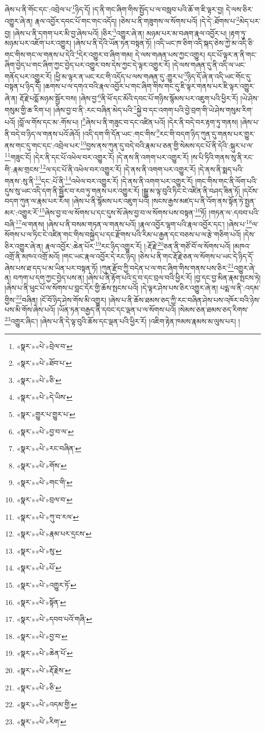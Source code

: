 ཞེས་པ་ནི་གོང་དང་:འབྲེལ་པ་\footnote{«སྣར་»«པེ་»བྲེལ་བ་}ཉིད་དོ། །ད་ནི་གང་ཞིག་གིས་སྤྱོད་པ་ལ་བསླབ་པའི་ཆོ་ག་ཇི་ལྟར་བྱ། དེ་ལས་ཅིར་འགྱུར་ཞེ་ན། རྣལ་འབྱོར་དབང་པོ་གང་གང་འདོད། །ཅེས་པ་ནི་གཟུགས་ལ་སོགས་པའོ། །དེ་དེ་:ཐོགས་པ་\footnote{«སྣར་»«པེ་»ཐོབ་པ་}མེད་པར་བྱ། །ཞེས་པ་ནི་དགག་པར་མི་བྱ་ཞེས་པའོ། །ཅིར་\footnote{«སྣར་»«པེ་»ཅི་}འགྱུར་ཞེ་ན། མཉམ་པར་མ་བཞག་རྣལ་འབྱོར་པ། །རྟག་ཏུ་མཉམ་པར་འཇོག་པར་འགྱུར། །ཞེས་པ་ནི་དེའི་ཡོན་ཏན་བསྟན་ཏོ། །འདི་ཡང་ཁ་ཅིག་འདི་སྐད་ཅེས་ཀྱེ་མ་འདི་ཅི་གང་གིས་གང་ལ་གནས་པ་དེའི་\footnote{«སྣར་»«པེ་»དེ་ཡིས་}དེར་འགྱུར་བ་ཞིག་གམ། དེ་ལས་གཞན་པས་ཀྱང་འགྱུར། དང་པོ་ལྟར་ན་ནི་གང་ཞིག་བྱེད་པ་གང་ཞིག་ཀྱང་བྱེད་པར་འགྱུར་བས་དེས་ཀྱང་དེ་ལྟར་འགྱུར་རོ། །དེ་ལས་གཞན་དུ་ནི་འདི་ལ་ཡང་གནོད་པར་འགྱུར་རོ། །ཕྱི་མ་ལྟར་ན་ཡང་རང་གི་འདོད་པ་ལས་གཞན་དུ་:གྱུར་པ་\footnote{«སྣར་»གྱུར་པ་གྱུར་པ་}ཉིད་དོ་ཞེ་ན་འདི་ཡང་གོང་དུ་བསྟན་པ་ཉིད་དོ། །ཆགས་པ་ལ་དགའ་བའི་རྣལ་འབྱོར་པ་གང་ཞིག་གིས་གང་དུ་ཇི་ལྟར་གནས་པར་ཇི་ལྟར་འགྱུར་ཞེ་ན། རྡོ་རྗེ་པདྨོ་མཉམ་སྦྱོར་བས། །ཞེས་བྱ་\footnote{«སྣར་»«པེ་»བྱ་བ་ལ་}ནི་ཕོ་དང་མོའི་དབང་པོ་གཉིས་སྙོམས་པར་འཇུག་པའི་ཕྱིར་རོ། །ཡེ་ཤེས་གསུམ་གྱི་ཆ་རིག་པ། །ཞེས་བྱ་བ་ནི་:རང་བཞིན་མེད་པའི་\footnote{«སྣར་»«པེ་»རང་བཞིན་}སྐྱེ་བ་དང་འགག་པའི་བྱེ་བྲག་གི་ཡེ་ཤེས་གསུམ་རིག་པའོ། །བློ་ལ་གོས་དང་མ་:གོས་པ། །\footnote{«སྣར་»«པེ་»གོས་}ཞེས་པ་ནི་གཟུང་བ་དང་འཛིན་པའོ། །དེར་ནི་བདེ་བར་རྟག་ཏུ་གནས། །ཞེས་པ་ནི་བདེ་བ་ཉིད་ལ་གནས་པའོ་ཞེའོ། །འདི་དག་གི་དོན་ཡང་:གང་གིས་\footnote{«སྣར་»«པེ་»གང་གི་}རང་གི་བདག་ཉིད་ཀུན་དུ་གནས་པར་གྱུར་ནས་གང་དུ་གང་དང་:འབྲེལ་པར་\footnote{«སྣར་»«པེ་»བྲལ་བ་}བྱས་ནས་ཀུན་དུ་བདེ་བའི་རྣམ་པ་ཅན་གྱི་སེམས་དང་པོ་ནི་དེའི་:སྐུར་པ་ལ་\footnote{«སྣར་»«པེ་»ཀུ་བ་རལ་}གཟུང་ངོ། །དེར་ནི་དང་པོ་འཕེལ་བར་འགྱུར་རོ། །དེ་ནས་ནི་འགག་པར་འགྱུར་རོ། །ས་པི་ཏིའི་གནས་སུ་ནི་རང་གི་:རྣམ་གྲངས་\footnote{«སྣར་»«པེ་»རྣམ་པར་དྲངས་}ལ་དང་པོ་ནི་འཕེལ་བར་འགྱུར་རོ། །དེ་ནས་ནི་འགག་པར་འགྱུར་རོ། །དེ་ནས་ནི་སྨད་པའི་གནས་:སུ་ནི་\footnote{«སྣར་»«པེ་»སུ་}དང་:པོ་ནི་\footnote{«སྣར་»«པེ་»པོ་}འཕེལ་བར་འགྱུར་རོ། །དེ་ནས་ནི་འགག་པར་འགྱུར་རོ། །གང་གིས་གང་ནི་ལོག་པའི་དུས་སུ་ཡང་འདི་དག་ནི་སྦྱོར་བ་རབ་ཏུ་གནས་པར་འགྱུར་རོ། །སྒྱུ་མ་ལྟ་བུའི་ཏིང་ངེ་འཛིན་ནི་བཤད་ཟིན་ཏོ། །དངོས་བདག་ཀུན་ལ་རྣམ་པར་རོལ། །ཞེས་པ་ནི་སྙོམས་པར་འཇུག་པའོ། །སངས་རྒྱས་མཛད་པ་ནི་འོག་ནས་སྟོན་ཏེ་སྤྱན་མར་:འགྱུར་རོ་\footnote{«སྣར་»«པེ་»འགྱུར་ཏོ་}ཞེས་བྱ་བ་ལ་སོགས་པ་དང་དུས་སོ་ཞེས་བྱ་བ་ལ་སོགས་པས་བསྟན་\footnote{«སྣར་»«པེ་»སྟོན་}ཏོ། །གཏན་ལ་:དབབ་པའི་བཞི་\footnote{«སྣར་»«པེ་»དབབ་པའོ་གཞི་}ལ་གནས། །ཞེས་པ་ནི་བསམ་གཏན་ལ་གནས་པའོ། །རྣལ་འབྱོར་ལྷག་པའི་རྣལ་འབྱོར་དང་། །ཞེས་པ་\footnote{«སྣར་»«པེ་»བྱ་བ་}ལ་སོགས་པ་ལ་ཏིང་ངེ་འཛིན་གང་གིས་བསྐྱེད་པ་དང་རྫོགས་པའི་རིམ་པ་རྒྱན་དང་བཅས་པ་ལ་རྩེ་གཅིག་པའོ། །དེས་ཅིར་འགྱུར་ཞེ་ན། རྣལ་འབྱོར་:ཆེན་པོར་\footnote{«སྣར་»«པེ་»ཆེན་པོ་}རང་ཉིད་འགྱུར་རོ། །:རྡོ་རྗེ་\footnote{«སྣར་»«པེ་»རྡོ་རྗེས་}ཅན་ནི་གཙོ་བོ་ལ་སོགས་པའོ། །མཁའ་འགྲོ་ནི་མཁའ་འགྲོ་མའོ། །གང་ཡང་རྣལ་འབྱོར་དེ་རང་ཉིད། །ཅེས་པ་ནི་གང་རྡོ་རྗེ་ཅན་ལ་སོགས་པ་ཡང་དེ་ཉིད་དོ་ཞེས་པས་ཐ་དད་པ་མ་ཡིན་པར་བསྟན་ཏོ། །ཀུན་རྫོབ་ཀྱི་བདེན་པ་ལ་གང་ཞིག་གིས་གནས་པས་ཅིར་\footnote{«སྣར་»«པེ་»ཅི་}འགྱུར་ཞེ་ན། བཀག་པ་དག་ཀྱང་བྱེད་པས་ན། །ཞེས་པ་ནི་རྟོག་པའི་དྲ་བ་དང་བྲལ་བའི་ཕྱིར་རོ། །བྱ་དང་བྱ་མིན་རྣམ་སྤངས་ཏེ། །ཞེས་པ་ནི་ཕུང་པོ་ལ་སོགས་པ་བླང་དོར་གྱི་ཆོས་སྤངས་པའོ། །དེ་ལྟར་ཤེས་པས་ཅིར་འགྱུར་ཞེ་ན། པདྨ་ལ་ནི་:འདམ་གྱིས་\footnote{«སྣར་»«པེ་»འདམ་གྱི་}བཞིན། །ངོ་བོ་ཉིད་ཤེས་གོས་མི་འགྱུར། །ཞེས་པ་ནི་ཆོས་ཐམས་ཅད་ཀྱི་རང་བཞིན་ཤེས་པས་འཁོར་བའི་ཉེས་པས་མི་གོས་ཞེས་པའོ། །ཡོན་ཏན་བརྒྱད་ནི་དབང་དང་ལྡན་པ་ལ་སོགས་པའོ། །སེམས་ཅན་ཐམས་ཅད་རིགས་\footnote{«སྣར་»«པེ་»རིག་}འགྱུར་ཞིང་། །ཞེས་པ་ནི་དེ་ལྟ་བུའི་ཆོས་དང་ལྡན་པའི་ཕྱིར་རོ། །འཇིག་རྟེན་ཁམས་རྣམས་མ་ལུས་པར། །
